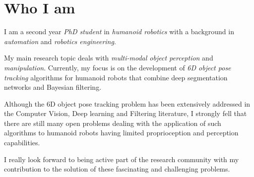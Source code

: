 \documentclass[11pt,a4paper,sans]{moderncv}        %
\begin{document}
\makecvtitle

\section{\textbf{Who I am}}
I am a second year \emph{PhD student} in \emph{humanoid robotics} with a background in \emph{automation} and \emph{robotics engineering}.
\par
My main research topic deals with \emph{multi-modal object perception} and \emph{manipulation}. Currently, my focus is on the development of \emph{6D object pose tracking} algorithms for humanoid robots that combine deep segmentation networks and Bayesian filtering.
\par
Although the 6D object pose tracking problem has been extensively addressed in the Computer Vision, Deep learning and Filtering literature, I strongly fell that there are still many open problems dealing with the application of such algorithms to humanoid robots having limited proprioception and perception capabilities.
\par
I really look forward to being active part of the research community with my contribution to the solution of these fascinating and challenging problems.
\end{document}
